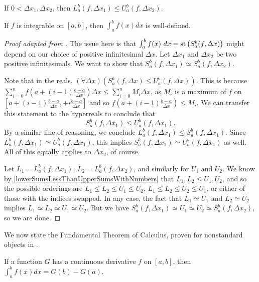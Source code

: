 \begin{corollary}\label{lowerSumsLessThanUpperSumsWithNumbers}
    If $0 < \Delta x_1, \Delta x_2$, then $L_a^b(f, \Delta x_1) \leq U_a^b(f, \Delta x_2)$.
\end{corollary}

\begin{thm}
    If $f$ is integrable on $[a, b]$, then $\int_a^b f(x)dx$ is well-defined.
\end{thm}

\begin{proof}[Proof adapted from ]
    The issue here is that $\int_a^b f(x)\ dx = \operatorname{st}\left(S_a^b(f, \Delta x)\right)$ might depend on our choice of positive infinitesimal $\Delta x$. Let $\Delta x_1$ and $\Delta x_2$ be two positive infinitesimals. We want to show that $S_a^b(f, \Delta x_1) \simeq S_a^b(f, \Delta x_2)$.

    Note that in the reals, $(\forall \Delta x)(S_a^b(f, \Delta x) \leq U_a^b(f, \Delta x))$. This is because $\sum_{i=0}^n f(a + (i-1)\frac{b-a}{\Delta x})\Delta x \leq \sum_{i=0}^n M_i \Delta x$, as $M_i$ is a maximum of $f$ on $[a + (i-1)\frac{b-a}{\Delta x},  + i\frac{b-a}{\Delta x}]$ and so $f(a + (i-1)\frac{b-a}{\Delta x}) \leq M_i$. We can transfer this statement to the hyperreals to conclude that 
    \[ 
    S_a^b(f, \Delta x_1) \leq U_a^b(f, \Delta x_1).
    \] 
    By a similar line of reasoning, we conclude $L_a^b(f, \Delta x_1) \leq S_a^b(f, \Delta x_1)$. Since $L_a^b(f, \Delta x_1) \simeq U_a^b(f, \Delta x_1)$, this implies $S_a^b(f, \Delta x_1) \simeq U_a^b(f, \Delta x_1)$ as well. All of this equally applies to $\Delta x_2$, of course.

    Let $L_1 = L_a^b(f, \Delta x_1)$, $L_2 = L_a^b(f, \Delta x_2)$, and similarly for $U_1$ and $U_2$. We know by \autoref{lowerSumsLessThanUpperSumsWithNumbers} that $L_1, L_2 \leq U_1, U_2$, and so the possible orderings are $L_1 \leq L_2 \leq U_1 \leq U_2$, $L_1 \leq L_2 \leq U_2 \leq U_1$, or either of those with the indices swapped. In any case, the fact that $L_1 \simeq U_1$ and $L_2 \simeq U_2$ implies $L_1 \simeq L_2 \simeq U_1 \simeq U_2$. But we have $S_a^b(f, \Delta x_1) \simeq U_1 \simeq U_2 \simeq S_a^b(f, \Delta x_2)$, so we are done.
\end{proof}
We now state the Fundamental Theorem of Calculus, proven for nonstandard objects in \cite[111-112]{goldblatt1998}. 

\begin{thm}\label{fundamentalTheoremCalculus}
    If a function $G$ has a continuous derivative $f$ on $[a, b]$, then $\int_a^b f(x) dx = G(b) - G(a)$.
\end{thm}


